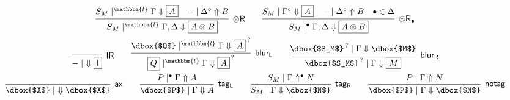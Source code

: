 \documentclass[runningheads]{llncs}
\newcommand{\tr}{\otimes \mathsf{R}}
\newcommand{\lleft}{{\multimap}\mathsf{L}}
\newcommand{\M}{\mathsf{M}}
\newcommand{\unitr}{\mathsf{IR}}
\newcommand{\otR}{\tr}
\newcommand{\IR}{\unitr}
\newcommand{\ax}{\mathsf{ax}}
\newcommand{\ot}{\otimes}
\newcommand{\lolli}{\multimap}
\newcommand{\I}{\mathsf{I}}
\newcommand{\up}{\Uparrow}
\newcommand{\dn}{\Downarrow}
\newcommand{\unfocL}{\mathsf{blur_L}}
\newcommand{\unfocR}{\mathsf{blur_R}}
\renewcommand{\l}{\mathbbm{l}}
\newcommand{\tagL}{\mathsf{tag_L}}
\newcommand{\tagR}{\mathsf{tag_R}}
\newcommand{\tagM}{\mathsf{notag}}
\begin{document}
\begin{equation}
\begin{array}{c}
{    }
        \\[6pt]
    \infer[\otR]{S_M \mid^\l \Gamma , \Delta \dn \fbox{$A \ot B$}}{
      S_M \mid^\l \Gamma \dn \fbox{$A$}
      &
      - \mid \Delta^\circ \up B
    }
    \qquad
    \infer[\otR_\bullet]{S_M \mid^{\bullet} \Gamma , \Delta \dn \fbox{$A \ot B$}}{
      S_M \mid \Gamma^{\circ} \dn \fbox{$A$}
      &
      - \mid \Delta^{\circ} \up B
      &
      \bullet \in \Delta
    }
    \\[6pt]
    \infer[\IR]{- \mid ~ \dn \fbox{$\I$}}{}
    \qquad
        \infer[\unfocL]{\fbox{$Q$} \mid^\l \Gamma \dn \fbox{$A$}^{\,?}}{
      \dbox{$Q$} \mid^\l \Gamma \dn \fbox{$A$}^{\,?}
      }    
    \qquad
        \infer[\unfocR]{\dbox{$S_M$}^{\,?} \mid \Gamma \dn \fbox{$M$}}{
      \dbox{$S_M$}^{\,?} \mid \Gamma \dn \dbox{$M$}
    }
    \\[6pt]
    \infer[\ax]{\dbox{$X$} \mid ~ \dn \dbox{$X$}}{}
    \qquad
    \infer[\tagL]{\dbox{$P$} \mid \Gamma \dn A}{
      P \mid^\bullet \Gamma \up A}
    \qquad
    \infer[\tagR]{S_M \mid \Gamma \dn \dbox{$N$}}{
      S_M \mid \Gamma \up^\bullet N }
    \qquad
    \infer[\tagM]{\dbox{$P$} \mid \Gamma \dn \dbox{$N$}}{
    P \mid \Gamma \up N}

\end{array}
\end{equation}
\end{document}

